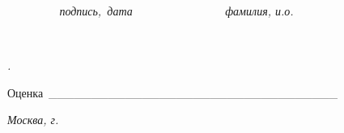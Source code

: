 \begin{adjustwidth}{0.49in}{0.39in}
\quad \quad \quad \textit{\quad \ \ \ \ \ \ \ \ \ подпись,\ дата\ \ \ \ \ \ \ \ \ \ \ \ \ \ \ \    фамилия, и.о.\ \  }\par

\end{adjustwidth}


\vspace{\baselineskip}
\begin{adjustwidth}{0.49in}{0.39in}
\quad \quad \quad \textit{\quad \ \ \ \ \ \ \  }\par

\end{adjustwidth}

\begin{adjustwidth}{0.49in}{0.39in}
\textit{.\ \ \ \ \ \ \ \ \ \ \  }\par

\end{adjustwidth}


\vspace{\baselineskip}

\vspace{\baselineskip}
Оценка\  \_\_\_\_\_\_\_\_\_\_\_\_\_\_\_\_\_\_\_\_\_\_\_\_\_\_\_\_\_\_\_\_\_\_\ \  \par


\vfill
\begin{center}
\textit{Москва, \the\year г.}
\end{center}

\newpage
